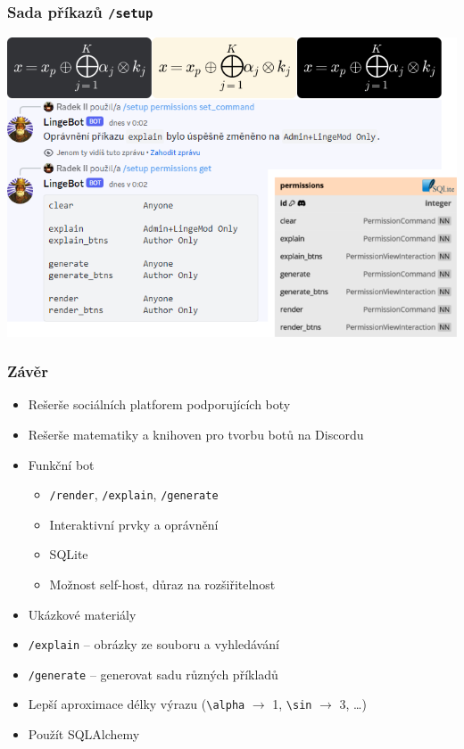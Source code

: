 \documentclass[FM]{tulpresentation} %
\begin{document}
	\begin{frame}[plain]\frametitle{Sada příkazů \texttt{/setup}}
		\includegraphics[width=.95\paperwidth]{img/idk7}
	\end{frame}
	
	\begin{frame}\frametitle{Závěr}
		\begin{itemize}
			\item Rešerše sociálních platforem podporujících boty
			\item Rešerše matematiky a knihoven pro tvorbu botů na Discordu
			\item Funkční bot
			\begin{itemize}
				\item \texttt{/render}, \texttt{/explain}, \texttt{/generate}
				\item Interaktivní prvky a oprávnění
				\item SQLite
				\item Možnost self-host, důraz na rozšiřitelnost
			\end{itemize}
			\item Ukázkové materiály
		\end{itemize}
		\begin{itemize}
			\item \texttt{/explain} – obrázky ze souboru a vyhledávání
			\item \texttt{/generate} – generovat sadu různých příkladů
			\item Lepší aproximace délky výrazu (\texttt{\textbackslash alpha} $\to$ 1, \texttt{\textbackslash sin} $\to$ 3, \dots)
			\item Použít SQLAlchemy
		\end{itemize}
	\end{frame}
	
\end{document}
